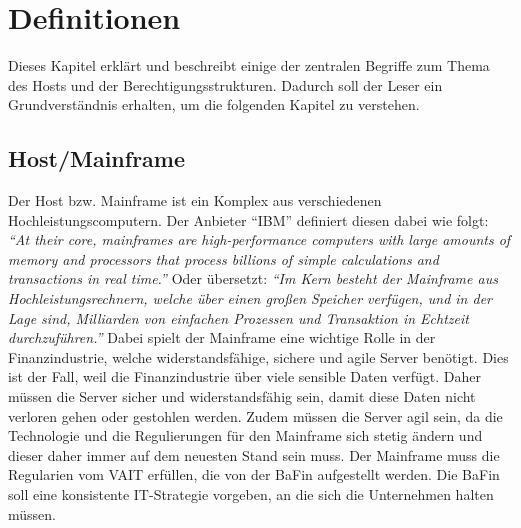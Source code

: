 \chapter{Definitionen}
\label{ch:chapter02}
Dieses Kapitel erklärt und beschreibt einige der zentralen Begriffe zum Thema des Hosts und der Berechtigungsstrukturen.
Dadurch soll der Leser ein Grundverständnis erhalten, um die folgenden Kapitel zu verstehen.

%
%

\section{Host/Mainframe}
\label{sec:Host}
Der Host bzw. Mainframe ist ein Komplex aus verschiedenen Hochleistungscomputern.
Der Anbieter "`IBM"' definiert diesen dabei wie folgt: 
\newline
\newline
\textit{"`At their core, mainframes are high-performance computers with large amounts of memory and processors that process billions of simple calculations and transactions in real time."'} \cite{Mainframe}
\newline
\newline
Oder übersetzt:
\newline
\newline
\textit{"`Im Kern besteht der Mainframe aus Hochleistungsrechnern, welche über einen großen Speicher verfügen, und in der Lage sind, Milliarden von einfachen Prozessen und Transaktion in Echtzeit durchzuführen."'} \cite{Mainframe}
\newline
\newline
Dabei spielt der Mainframe eine wichtige Rolle in der Finanzindustrie, welche widerstandsfähige, sichere und agile Server benötigt.
Dies ist der Fall, weil die Finanzindustrie über viele sensible Daten verfügt.
Daher müssen die Server sicher und widerstandsfähig sein, damit diese Daten nicht verloren gehen oder gestohlen werden.
Zudem müssen die Server agil sein, da die Technologie und die Regulierungen für den Mainframe sich stetig ändern und dieser daher immer auf dem neuesten Stand sein muss.
Der Mainframe muss die Regularien vom \ac{VAIT} erfüllen, die von der \ac{BaFin} aufgestellt werden.
Die \ac{BaFin} soll eine konsistente IT-Strategie vorgeben, an die sich die Unternehmen halten müssen. \cite{Vait}

